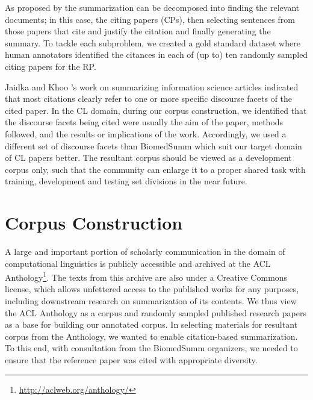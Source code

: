\documentclass[11pt]{article}
\begin{document}
As proposed by \cite{vu2010,hoang2010} the summarization can be
decomposed into finding the relevant documents; in this case, the
citing papers (CPs), then selecting sentences from those papers that
cite and justify the citation and finally generating the summary. To
tackle each subproblem, we created a gold standard dataset where human
annotators identified the citances in each of (up to) ten randomly sampled
citing papers for the RP.


Jaidka and Khoo 's work on summarizing
information science articles indicated that most citations clearly
refer to one or more specific discourse facets of the cited paper. In
the CL domain, during our corpus construction, we identified that the
discourse facets being cited were usually the aim of the paper,
methods followed, and the results or implications of the
work. Accordingly, we used a different set of discourse facets than
BiomedSumm which suit our target domain of CL papers better.  The
resultant corpus should be viewed as a development corpus only, such
that the community can enlarge it to a proper shared task with
training, development and testing set divisions in the near future.


\section{Corpus Construction}
\label{corpus}
A large and important portion of scholarly communication in the domain
of computational linguistics is publicly accessible and archived at
the ACL Anthology\footnote{\url{http://aclweb.org/anthology/}}.  The
texts from this archive are also under a Creative Commons license,
which allows unfettered access to the published works for any
purposes, including downstream research on summarization of its
contents.  
We thus view the ACL Anthology as a corpus and randomly sampled
published research papers as a base for building our annotated corpus.
In selecting materials for resultant corpus from the Anthology, we
wanted to enable citation-based summarization. To this end, with
consultation from the BiomedSumm organizers, we needed to ensure that
the reference paper was cited with appropriate diversity.
\end{document}
